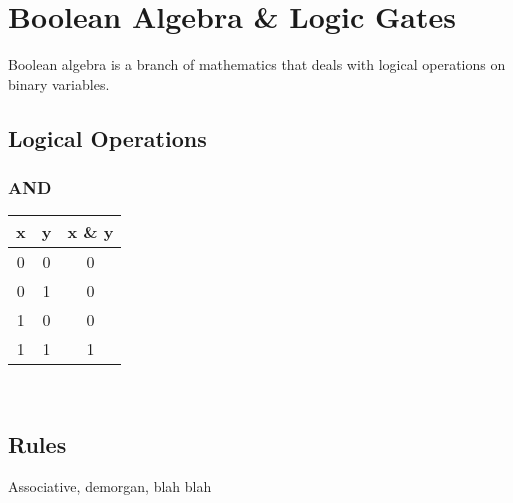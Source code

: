 \chapter{Boolean Algebra \& Logic Gates}

Boolean algebra is a branch of mathematics that deals with logical operations on binary variables.

\section{Logical Operations}

\subsection{AND}

\begin{tabular}{c c c}
	\hline
	\textbf{x} & \textbf{y} & \textbf{x \& y} \\ 
	\hline
	0 & 0 & 0 \\
	0 & 1 & 0 \\
	1 & 0 & 0 \\
	1 & 1 & 1 \\
	\hline 
\end{tabular} \\

\section{Rules}

Associative, demorgan, blah blah